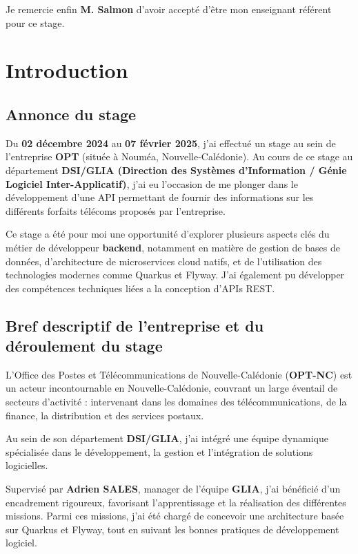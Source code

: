 \documentclass[11pt]{article}
\begin{document}
		Je remercie enfin \textbf{M. Salmon} d’avoir accepté d’être mon enseignant référent pour ce stage.
	
		\newpage
		\tableofcontents
		\newpage
		\section{Introduction}
		
		\subsection{Annonce du stage}
		
		Du \textbf{02 décembre 2024} au \textbf{07 février 2025}, j’ai effectué un stage au sein de l’entreprise \textbf{OPT} (située à Nouméa, Nouvelle-Calédonie). Au cours de ce stage au département \textbf{DSI/GLIA (Direction des Systèmes d'Information / Génie Logiciel Inter-Applicatif)}, j’ai eu l’occasion de me plonger dans le développement d’une API permettant de fournir des informations sur les différents forfaits télécoms proposés par l’entreprise.
		
		Ce stage a été pour moi une opportunité d’explorer plusieurs aspects clés du métier de développeur \textbf{backend}, notamment en matière de gestion de bases de données, d’architecture de microservices cloud natifs, et de l’utilisation des technologies modernes comme Quarkus et Flyway. J’ai également pu développer des compétences techniques liées a la conception d’APIs REST.
		
		\subsection{Bref descriptif de l’entreprise et du déroulement du stage}
		
		L’Office des Postes et Télécommunications de Nouvelle-Calédonie (\textbf{OPT-NC}) est un acteur incontournable en Nouvelle-Calédonie, couvrant un large éventail de secteurs d'activité : intervenant dans les domaines des télécommunications, de la finance, la distribution et des services postaux.
		
		Au sein de son département \textbf{DSI/GLIA}, j’ai intégré une équipe dynamique spécialisée dans le développement, la gestion et l'intégration de solutions logicielles.
		
		
		Supervisé par \textbf{Adrien SALES}, manager de l’équipe \textbf{GLIA}, j’ai bénéficié d’un encadrement rigoureux, favorisant l’apprentissage et la réalisation des différentes missions. Parmi ces missions, j’ai été chargé de concevoir une architecture basée sur Quarkus et Flyway, tout en suivant les bonnes pratiques de développement logiciel.
		
\end{document}
